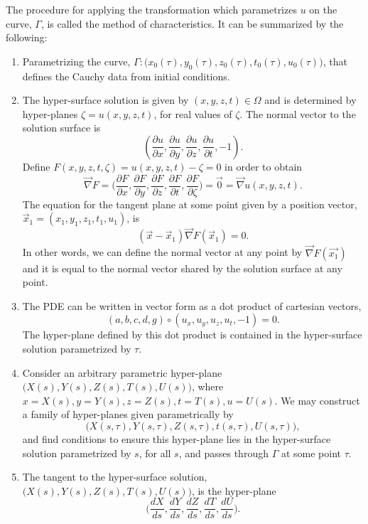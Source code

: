 \documentclass[12pt]{article}
\theoremstyle{definition}
\numberwithin{equation}{section}
\begin{document}
{The procedure for applying the transformation which parametrizes $u$ on the curve, $\Gamma$, is called the method of characteristics. It can be summarized by the following:
\begin{enumerate}
\item Parametrizing the curve, $\Gamma:\big(x_0(\tau),y_0(\tau),z_0(\tau),t_0(\tau),u_0(\tau)\big)$, that defines the Cauchy data from initial conditions.
\item The hyper-surface solution is given by $(x,y,z,t)\in\Omega$ and is determined by hyper-planes $\zeta=u(x,y,z,t)$, for real values of $\zeta$.  The normal vector to the solution surface is 
$$(\frac{\partial u}{\partial x},\frac{\partial u}{\partial y},\frac{\partial u}{\partial z},\frac{\partial u}{\partial t},-1).$$
Define $F(x,y,z,t,\zeta)=u(x,y,z,t)-\zeta=0$ in order to obtain
$$\vec{\nabla}F=\Big(\frac{\partial F}{\partial x},\frac{\partial F}{\partial y},\frac{\partial F}{\partial z},\frac{\partial F}{\partial t},\frac{\partial F}{\partial\zeta}\Big)=\vec{0}=\vec{\nabla}u(x,y,z,t).$$
The equation for the tangent plane at some point given by a position vector, $\vec{x}_1=(x_1,y_1,z_1,t_1,u_1)$, is
$$(\vec{x}-\vec{x}_1)\vec{\nabla}F(\vec{x}_1)=0.$$ In other words, we can define the normal vector at any point by $\vec{\nabla}F(\vec{x_1})$ and it is equal to the normal vector shared by the solution surface at any point.
\item The PDE can be written in vector form as a dot product of cartesian vectors, 
\begin{equation}
(a,b,c,d,g)\circ(u_x,u_y,u_z,u_t,-1)=0.
\label{char1.eqn}
\end{equation}
The hyper-plane defined by this dot product is contained in the hyper-surface solution parametrized by $\tau$. 
\item Consider an arbitrary parametric hyper-plane $\big(X(s),Y(s),Z(s),T(s),U(s)\big)$, where $x=X(s),y=Y(s),z=Z(s),t=T(s),u=U(s)$. We may construct a family of hyper-planes given parametrically by
\begin{equation}
\big(X(s,\tau),Y(s,\tau),Z(s,\tau),t(s,\tau),U(s,\tau)\big),
\label{curve.eqn}
\end{equation}
and find conditions to ensure this hyper-plane lies in the hyper-surface solution parametrized by $s$, for all $s$, and passes through $\Gamma$ at some point $\tau$.
\item The tangent to the hyper-surface solution, $\big(X(s),Y(s),Z(s),T(s),U(s)\big)$, is the hyper-plane
$$\Big(\frac{dX}{ds},\frac{dY}{ds},\frac{dZ}{ds},\frac{dT}{ds},\frac{dU}{ds}\Big).$$

\end{enumerate}}
\end{document}
